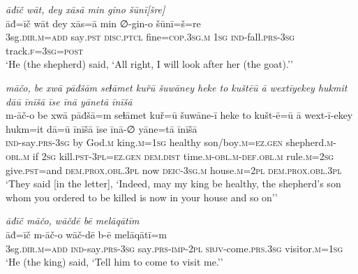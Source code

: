 \ea \label{KŠ.29}
\textit{āđīč wāt, dey xāsā min gino šūnī[šre]} \\ 
\gll āđ=īč wāt dey xās=ā min ∅-gin-o šūnī=š=re \\ 
 3sg\textsc{.dir}\textsc{.m}\textsc{=add} say\textsc{.pst} \textsc{disc.ptcl} fine\textsc{=cop}\textsc{.3sg}\textsc{.m} \textsc{1sg} \textsc{ind-}fall\textsc{.prs}\textsc{-3sg} track\textsc{.f}\textsc{=3sg}\textsc{=\textsc{post}} \\ 
\glt `He (the shepherd) said, ‘All right, I will look after her (the goat).’'
\z 
 
\ea \label{KŠ.51}
\textit{māčo, be xwā pāđšām seɫāmet kuřū šuwāney heke to kuštēū ā wextīyekey hukmit dāū īnīšā īse īnā yānetā īnīšā} \\ 
\gll m-āč-o be xwā pāđšā=m seɫāmet kuř=ū šuwāne-ī heke to kušt-ē=ū ā wext-ī-ekey hukm=it dā=ū īnīšā īse īnā-∅ yāne=tā īnīšā \\ 
 \textsc{ind-}say\textsc{.prs}\textsc{-3sg} by God\textsc{.m} king\textsc{.m}\textsc{=\textsc{1sg}} healthy son/boy\textsc{.m}\textsc{=ez.gen} shepherd\textsc{.m}\textsc{-obl}\textsc{.m} if \textsc{2sg} kill\textsc{.pst}\textsc{-3pl}\textsc{=ez.gen} \textsc{dem.dist} time\textsc{.m}\textsc{-obl}\textsc{.m}\textsc{-def}\textsc{.obl}\textsc{.m} rule\textsc{.m}\textsc{=\textsc{2sg}} give\textsc{.pst}=and \textsc{dem.prox}\textsc{.obl}\textsc{.3pl} now \textsc{deic}\textsc{-3sg}\textsc{.m} house\textsc{.m}=\textsc{2pl} \textsc{dem.prox}\textsc{.obl}\textsc{.3pl} \\ 
\glt `They said [in the letter], ‘Indeed, may my king be healthy, the shepherd’s son whom you ordered to be killed is now in your house and so on’'
\z 
 
\ea \label{KŠ.52}
\textit{āđīč māčo, wāčdē bē melāqātīm} \\ 
\gll āđ=īč m-āč-o wāč-dē b-ē melāqātī=m \\ 
 3sg\textsc{.dir}\textsc{.m}\textsc{=add} \textsc{ind-}say\textsc{.prs}\textsc{-3sg} say\textsc{.prs}-\textsc{imp-}\textsc{2pl} \textsc{sbjv-}come\textsc{.prs}\textsc{.3sg} visitor\textsc{.m}\textsc{=\textsc{1sg}} \\ 
\glt `He (the king) said, ‘Tell him to come to visit me.’'
\z 
 
